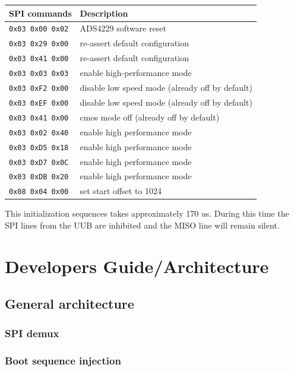 \documentclass[a4paper,indent]{paper}
\begin{document}
\begin{center}
  \begin{tabular}{|l|l|}
    \hline
    SPI commands & Description \\
    \hline
    \texttt{0x03 0x00 0x02} & ADS4229 software reset \\
    \texttt{0x03 0x29 0x00} & re-assert default configuration \\
    \texttt{0x03 0x41 0x00} & re-assert default configuration \\
    \texttt{0x03 0x03 0x03} & enable high-performance mode \\
    \texttt{0x03 0xF2 0x00} & disable low speed mode (already off by default)\\
    \texttt{0x03 0xEF 0x00} & disable low speed mode (already off by default)\\
    \texttt{0x03 0x41 0x00} & cmos mode off (already off by default)\\
    \texttt{0x03 0x02 0x40} & enable high performance mode \\
    \texttt{0x03 0xD5 0x18} & enable high performance mode \\
    \texttt{0x03 0xD7 0x0C} & enable high performance mode \\
    \texttt{0x03 0xDB 0x20} & enable high performance mode \\
    \texttt{0x08 0x04 0x00} & set start offset to 1024 \\
    \hline
  \end{tabular}
  
\end{center}

This initialization sequences takes approximately 170 us. During this time the SPI lines from the UUB are inhibited and the MISO line will remain silent.




\section{Developers Guide/Architecture}
\subsection{General architecture}
\subsubsection{SPI demux}

\subsubsection{Boot sequence injection}
\end{document}
